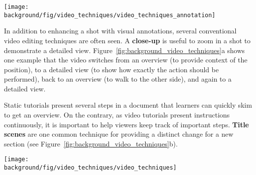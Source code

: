 \begin{table*}[!htbp]
  \centering
  \texttt{[image: \\background/fig/video\_techniques/video\_techniques\_annotation]}
  \begin{minipage}{\textwidth}
  \caption[Example annotation techniques used in a video tutorial.]{
    Example annotation techniques used in a video tutorial\footnote{``How to use Loola 3 stroller'' by Maxi-Cosi, \url{https://youtu.be/p6MzLXeWBJw}, licensed under CC BY 2.0}.
  }
  \label{background_video_annotation_techniques}
  \end{minipage}
\end{table*}

In addition to enhancing a shot with visual annotations, several conventional video editing techniques are often seen. A \textbf{close-up} is useful to zoom in a shot to demonstrate a detailed view. Figure~\ref{fig:background_video_techniques}a shows one example that the video switches from an overview (to provide context of the position), to a detailed view (to show how exactly the action should be performed), back to an overview (to walk to the other side), and again to a detailed view.

Static tutorials present several steps in a document that learners can quickly skim to get an overview. On the contrary, as video tutorials present instructions continuously, it is important to help viewers keep track of important steps. \textbf{Title scenes} are one common technique for providing a distinct change for a new section (see Figure~\ref{fig:background_video_techniques}b).

\begin{figure*}[h!]
  \centering
  \texttt{[image: \\background/fig/video\_techniques/video\_techniques]}
  \begin{minipage}{\textwidth}
  \caption[Example video editing techniques used in a video tutorial.]{
    Example video editing techniques used in a video tutorial\footnote{``How to use Loola 3 stroller'' by Maxi-Cosi, \url{https://youtu.be/p6MzLXeWBJw}, licensed under CC BY 2.0}:
    (a) a sequence of overview and detailed shots, and
    (b) a title scene to introduce a new section, which can include animation or movement as a preview.
  }
  \label{fig:background_video_techniques}
  \end{minipage}
\end{figure*}


